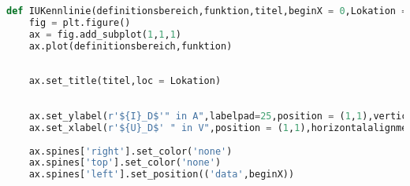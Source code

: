 \begin{lstlisting}[caption= Funktion zum Erzeugen einer I-U Kennlinie, label=lst:IUKennlinie,language=Python] 
def IUKennlinie(definitionsbereich,funktion,titel,beginX = 0,Lokation = 'Center'):
    fig = plt.figure()
    ax = fig.add_subplot(1,1,1)
    ax.plot(definitionsbereich,funktion)
    
    
    ax.set_title(titel,loc = Lokation)
  
    
    ax.set_ylabel(r'${I}_D$'" in A",labelpad=25,position = (1,1),verticalalignment = 'top',rotation = 'horizontal')
    ax.set_xlabel(r'${U}_D$' " in V",position = (1,1),horizontalalignment='right')
    
    ax.spines['right'].set_color('none')
    ax.spines['top'].set_color('none')
    ax.spines['left'].set_position(('data',beginX))
\end{lstlisting}
